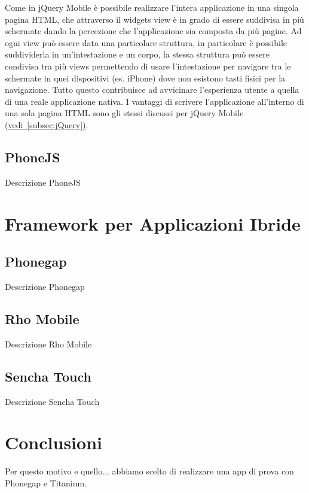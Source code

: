 			Come in jQuery Mobile è possibile realizzare l'intera applicazione 
			in una singola pagina HTML, che attraverso il widgets view è in grado 
			di essere suddivisa in più schermate dando la percezione che l'applicazione 
			sia composta da più pagine. Ad ogni view può essere data una particolare 
			struttura, in particolare è possibile suddividerla in un'intestazione 
			e un corpo, la stessa struttura può essere condivisa tra più views 
			permettendo di usare l'intestazione per navigare tra le schermate in 
			quei dispositivi (es. iPhone) dove non esistono tasti fisici per la
			navigazione. Tutto questo contribuisce ad avvicinare l'esperienza utente
			a quella di una reale applicazione nativa. I vantaggi di scrivere 
			l'applicazione all'interno
			di una sola pagina HTML sono gli stessi discussi per jQuery Mobile 
			\hyperref[subsec:jQuery]{(vedi~\ref{subsec:jQuery})}.
		\subsection{PhoneJS}
			Descrizione PhoneJS

			
	\section{Framework per Applicazioni Ibride}
	\label{sec:frameworkhybrid}
		\subsection{Phonegap}
			Descrizione Phonegap

		\subsection{Rho Mobile}
			Descrizione Rho Mobile

		\subsection{Sencha Touch}
			Descrizione Sencha Touch
	
	\section{Conclusioni}
		Per questo motivo e quello... abbiamo scelto di realizzare una app di 
		prova con Phonegap e Titanium.
